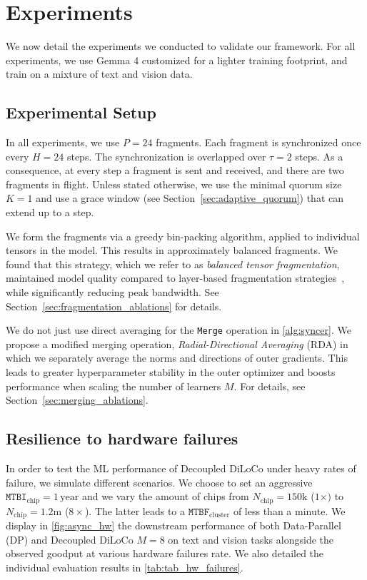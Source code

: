 \documentclass[11pt, a4paper, twocolumn, copyright, google]{google}
\newcommand{\mergefn}{\texttt{Merge}\xspace}
\begin{document}
\section{Experiments}\label{sec:experiments}

We now detail the experiments we conducted to validate our framework. For all experiments, we use Gemma 4 \citep{gemma4_2026} customized for a lighter training footprint, and train on a mixture of text and vision data.

\subsection{Experimental Setup}

In all experiments, we use $P=24$ fragments. Each fragment is synchronized once every $H=24$ steps. The synchronization is overlapped over $\tau=2$ steps. As a consequence, at every step a fragment is sent and received, and there are two fragments in flight. Unless stated otherwise, we use the minimal quorum size $K=1$ and use a grace window (see Section~\ref{sec:adaptive_quorum}) that can extend up to a step.

We form the fragments via a greedy bin-packing algorithm, applied to individual tensors in the model. This results in approximately balanced fragments. We found that this strategy, which we refer to as \emph{balanced tensor fragmentation}, maintained model quality compared to layer-based fragmentation strategies~\citep{douillard2025streaming}, while significantly reducing peak bandwidth. See Section~\ref{sec:fragmentation_ablations} for details.

We do not just use direct averaging for the \mergefn operation in \autoref{alg:syncer}. We propose a modified merging operation, \emph{Radial-Directional Averaging} (RDA) in which we separately average the norms and directions of outer gradients. This leads to greater hyperparameter stability in the outer optimizer and boosts performance when scaling the number of learners $M$. For details, see Section~\ref{sec:merging_ablations}.

\subsection{Resilience to hardware failures}\label{sec:exp_hardware_failures}


In order to test the ML performance of Decoupled DiLoCo under heavy rates of failure, we simulate different scenarios. We choose to set an aggressive $\texttt{MTBI}_{\text{chip}} = 1\, \text{year}$ and we vary the amount of chips from $N_\text{chip}=150\text{k}$ ($1\times)$ to $N_\text{chip}=1.2\text{m}$ ($8\times$). The latter leads to a $\texttt{MTBF}_\text{cluster}$ of less than a minute. We display in \autoref{fig:async_hw} the downstream performance of both Data-Parallel (DP) and Decoupled DiLoCo $M=8$ on text and vision tasks alongside the observed goodput at various hardware failures rate. We also detailed the individual evaluation results in \autoref{tab:tab_hw_failures}.
\end{document}
